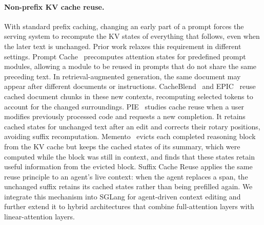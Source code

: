 \paragraph{Non-prefix KV cache reuse.}
With standard prefix caching, changing an early part of a prompt forces the serving system to recompute the KV states of everything that follows, even when the later text is unchanged. Prior work relaxes this requirement in different settings. Prompt Cache~\citep{gim2024prompt} precomputes attention states for predefined prompt modules, allowing a module to be reused in prompts that do not share the same preceding text. In retrieval-augmented generation, the same document may appear after different documents or instructions. CacheBlend~\citep{yao2025cacheblend} and EPIC~\citep{hu2025epic} reuse cached document chunks in these new contexts, recomputing selected tokens to account for the changed surroundings.
PIE~\citep{he2025let} studies cache reuse when a user modifies previously processed code and requests a new completion. It retains cached states for unchanged text after an edit and corrects their rotary positions, avoiding suffix recomputation. Memento~\citep{kontonis2026memento} evicts each completed reasoning block from the KV cache but keeps the cached states of its summary, which were computed while the block was still in context, and finds that these states retain useful information from the evicted block. Suffix Cache Reuse applies the same reuse principle to an agent's live context: when the agent replaces a span, the unchanged suffix retains its cached states rather than being prefilled again. We integrate this mechanism into SGLang for agent-driven context editing and further extend it to hybrid architectures that combine full-attention layers with linear-attention layers.

